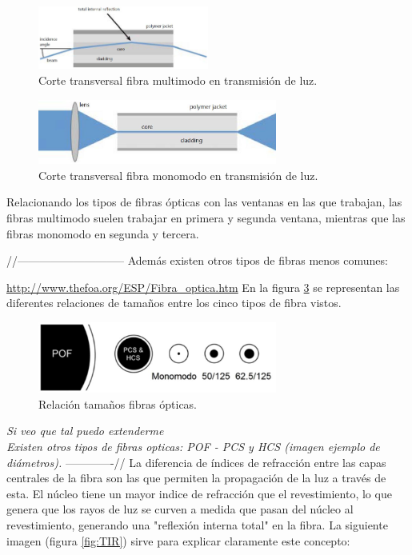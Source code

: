 \begin{itemize}
   	\begin{figure}[H]
		\centering
		\includegraphics[width=0.5\textwidth]{./img/guiaMM}
		\caption{Corte transversal fibra multimodo en transmisión de luz. \cite{imgMonoMulti} } 
		\label{fig:guiaMM}
	\end{figure} 
  	\begin{figure}[H]
		\centering
		\includegraphics[width=0.7\textwidth]{./img/guiaSM}
		\caption{Corte transversal fibra monomodo en transmisión de luz. \cite{imgMonoMulti} } 
		\label{fig:guiaSM}
	\end{figure}  
 	
 	Relacionando los tipos de fibras ópticas con las ventanas en las que trabajan, las fibras multimodo suelen trabajar en primera y segunda ventana, mientras que las fibras monomodo en segunda y tercera. 

//----------------------------- 	
 	Además existen otros tipos de fibras menos comunes:
 	
 	\url{http://www.thefoa.org/ESP/Fibra_optica.htm}
 	En la figura \ref{fig:otrosTiposFO} se representan las diferentes relaciones de tamaños entre los cinco tipos de fibra vistos. 
 	 	
 	 \begin{figure}[H]
 	 	\centering
 	 	\includegraphics[width=0.7\textwidth]{./img/tiposFO}
 	 	\caption{Relación tamaños fibras ópticas. \cite{FOA} } 
 	 	\label{fig:otrosTiposFO}
 	 \end{figure} 	
 	 	
 	\textcolor{rositaoscuro}{\textit{Si veo que tal puedo extenderme\\Existen otros tipos de fibras opticas: POF - PCS y HCS (imagen ejemplo de diámetros).}}
-------------//
 La diferencia de índices de refracción entre las capas centrales de la fibra son las que permiten la propagación de la luz a través de esta. El núcleo tiene un mayor indice de refracción que el revestimiento, lo que genera que los rayos de luz se curven a medida que pasan del núcleo al revestimiento, generando una "reflexión interna total" en la fibra. La siguiente imagen (figura \ref{fig:TIR}) sirve para explicar claramente este concepto:
 

\end{itemize}
